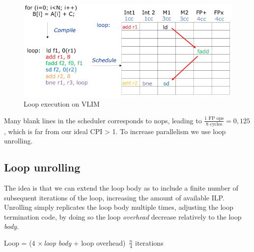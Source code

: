 \begin{figure}[h]
    \centering
    \includegraphics[scale = 0.4]{images/vliw-no-loop-unrolling}
    \caption{Loop execution on VLIM}
    \label{fig:vliw-no-loop-unrolling}
\end{figure}

Many blank lines in the scheduler corresponds to nops, leading to \(\frac{1\text{ FP ops}}{8\text{ cycles}} = 0,125\)
, which is far from our ideal CPI > 1.
To increase parallelism we use loop unrolling.

\subsection{Loop unrolling}\label{subsec:loop-unrolling}
The idea is that we can extend the loop body as to include a finite number of subsequent iterations of the loop,
increasing the amount of available ILP\@.
Unrolling simply replicates the loop body multiple times, adjusting the loop termination code, by doing so the loop
\textit{overhead} decrease relatively to the loop \textit{body}.

\begin{center}
    Loop = (\(4\, \times\)\textit{loop body} + loop overhead) \texttimes $\, \frac{n}{4}$ iterations
\end{center}

